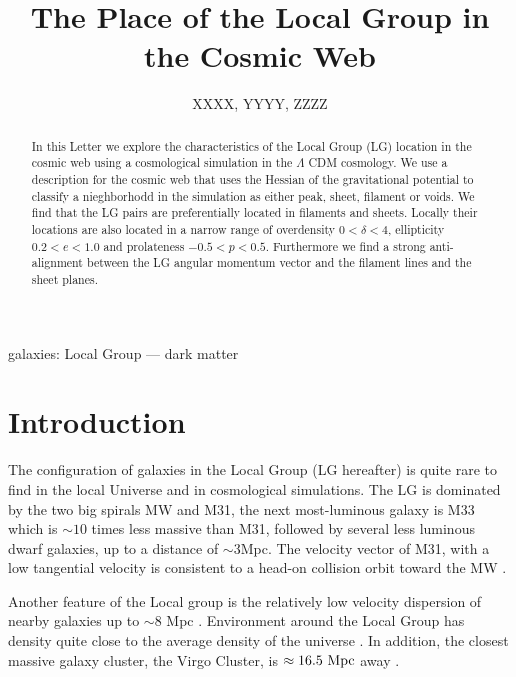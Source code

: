 \documentclass{emulateapj}
\newcommand{\mpc}{\rm{Mpc}}
\begin{document}
\title{The Place of the Local Group in the Cosmic Web} 
\author{
  XXXX,
  YYYY,
  ZZZZ
}

\begin{abstract}
In this Letter we explore the characteristics of the Local Group (LG)
location in the cosmic web using a cosmological simulation in the
$\Lambda$ CDM cosmology.
We use a description for the cosmic web that uses the Hessian of the
gravitational potential to classify a nieghborhodd in the simulation
as either peak, sheet, filament or voids. We find that the LG pairs
are preferentially located in filaments and sheets. Locally their
locations are also located in a narrow range of overdensity
$0<\delta<4$, ellipticity $0.2<e<1.0$ and prolateness
$-0.5<p<0.5$. Furthermore we find a strong anti-alignment between the
LG angular momentum vector and the filament lines and the sheet 
planes.  
\end{abstract}

\begin{keywords}
{galaxies: Local Group --- dark matter}
\end{keywords}


\section{Introduction}
\label{sec:intro}

The configuration of galaxies in the Local Group (LG hereafter) is quite rare to find in the local Universe and in cosmological simulations. 
The LG is dominated by the two big spirals MW and M31, the next most-luminous galaxy is M33 which is $\sim 10$ times less massive than M31, followed by several less luminous dwarf galaxies, up to a distance of $\sim 3$\mpc.
The velocity vector of M31, with a low tangential velocity is
consistent to a head-on collision orbit toward the MW
\citep{2008MNRAS.386..461C,2012ApJ...753....8V,2012ApJ...753....7S}. 

Another feature of the Local group is the relatively low velocity
dispersion of nearby galaxies up to $\sim 8$ Mpc \citep[][and
  references therein]{1975ApJ...196..313S,2011MNRAS.415L..16A}. 
Environment around the Local Group has density quite close to the
average density of the universe
\citep{2003ApJ...596...19K,2005AJ....129..178K}. In addition, the
closest massive galaxy cluster, the Virgo Cluster, is $\approx
16.5\ \mpc$ away \citep{2007ApJ...655..144M}. 
\end{document}
